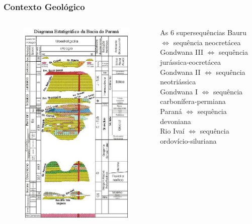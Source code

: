 \documentclass[aspectratio=10]{beamer} %
\begin{document}
\begin{frame}
\frametitle{Contexto Geológico}
\begin{columns}


\begin{column}{0.4\textwidth}
\begin{figure}
\includegraphics[scale=0.4]{Imagens/diagrama.png}
\end{figure}
\end{column}

\begin{column}{0.55\textwidth}
\begin{block}{As $6$ supersequências}
Bauru $\Longleftrightarrow$  sequência neocretácea\\
Gondwana III $\Longleftrightarrow$ sequência jurássica-eocretácea\\
Gondwana II $\Longleftrightarrow$ sequência neotriássica \\
Gondwana I $\Longleftrightarrow$ sequência carbonífera-permiana\\ 
Paraná $\Longleftrightarrow$ sequência devoniana\\
Rio Ivaí $\Longleftrightarrow$ sequência ordovício-siluriana\\
\cite{Vail_1977,assine_1994,milani_orogenias_1998}
\end{block}


\end{column}
\end{columns}
\end{frame}
\end{document}

